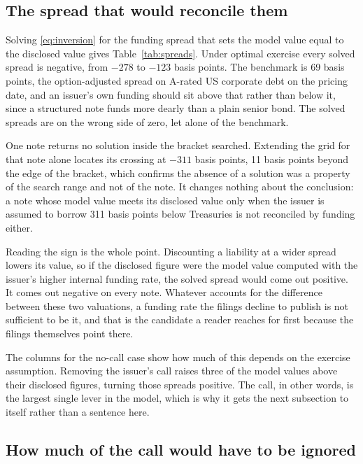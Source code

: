 \subsection{The spread that would reconcile them}



Solving \eqref{eq:inversion} for the funding spread that sets the model value
equal to the disclosed value gives Table~\ref{tab:spreads}. Under optimal
exercise every solved spread is negative, from $-278$ to $-123$ basis points.
The benchmark is 69 basis points, the option-adjusted spread on A-rated US
corporate debt on the pricing date, and an issuer's own funding should sit
above that rather than below it, since a structured note funds more dearly than
a plain senior bond. The solved spreads are on the wrong side of zero, let
alone of the benchmark.

One note returns no solution inside the bracket searched. Extending the grid
for that note alone locates its crossing at $-311$ basis points, 11 basis
points beyond the edge of the bracket, which confirms the absence of a solution
was a property of the search range and not of the note. It changes nothing
about the conclusion: a note whose model value meets its disclosed value only
when the issuer is assumed to borrow 311 basis points below Treasuries is not
reconciled by funding either.

Reading the sign is the whole point. Discounting a liability at a wider spread
lowers its value, so if the disclosed figure were the model value computed with
the issuer's higher internal funding rate, the solved spread would come out
positive. It comes out negative on every note. Whatever accounts for the
difference between these two valuations, a funding rate the filings decline to
publish is not sufficient to be it, and that is the candidate a reader reaches
for first because the filings themselves point there.

The columns for the no-call case show how much of this depends on the exercise
assumption. Removing the issuer's call raises three of the model values above
their disclosed figures, turning those spreads positive. The call, in other
words, is the largest single lever in the model, which is why it gets the next
subsection to itself rather than a sentence here.

\subsection{How much of the call would have to be ignored}

